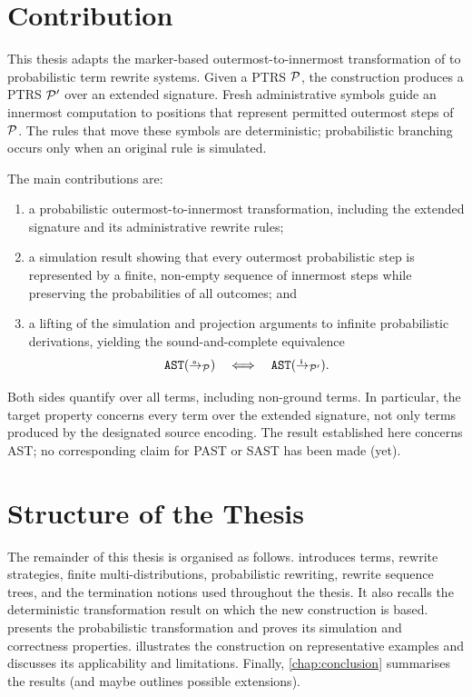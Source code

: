 \section{Contribution}

This thesis adapts the marker-based outermost-to-innermost transformation of
\cite{thiemann_2009_outermost} to probabilistic term rewrite systems.  Given a
PTRS $\P$, the construction produces a PTRS $\P'$ over an extended signature.
Fresh administrative symbols guide an innermost computation to positions that
represent permitted outermost steps of $\P$.  The rules that move these symbols
are deterministic; probabilistic branching occurs only when an original rule
is simulated.

The main contributions are:

\begin{enumerate}
  \item a probabilistic outermost-to-innermost transformation, including the
        extended signature and its administrative rewrite rules;
  \item a simulation result showing that every outermost probabilistic step is
        represented by a finite, non-empty sequence of innermost steps while
        preserving the probabilities of all outcomes; and
  \item a lifting of the simulation and projection arguments to infinite
        probabilistic derivations, yielding the sound-and-complete equivalence
        \[
          \AST[\oto_{\P}]
          \quad\Longleftrightarrow\quad
          \AST[\ito_{\P'}].
        \]
\end{enumerate}

Both sides quantify over all terms, including non-ground terms.  In particular,
the target property concerns every term over the extended signature, not only
terms produced by the designated source encoding.  The result established here
concerns AST; no corresponding claim for PAST or SAST has been made (yet).

\section{Structure of the Thesis}

The remainder of this thesis is organised as follows.
 introduces terms, rewrite strategies, finite
multi-distributions, probabilistic rewriting, rewrite sequence trees, and the
termination notions used throughout the thesis.  It also recalls the
deterministic transformation result on which the new construction is based.
 presents the probabilistic transformation and proves
its simulation and correctness properties.   illustrates
the construction on representative examples and discusses its applicability
and limitations.  Finally, \cref{chap:conclusion} summarises the results (and maybe
outlines possible extensions).
